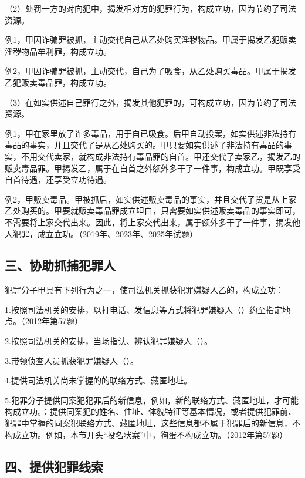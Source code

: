 （2）处罚一方的对向犯中，揭发相对方的犯罪行为，构成立功，因为节约了司法资源。

例1，甲因诈骗罪被抓，主动交代自己从乙处购买淫秽物品。甲属于揭发乙犯贩卖淫秽物品牟利罪，构成立功。

例2，甲因诈骗罪被抓，主动交代，自己为了吸食，从乙处购买毒品。甲属于揭发乙犯贩卖毒品罪，构成立功。

（3）在如实供述自己罪行之外，揭发其他犯罪的，可构成立功，因为节约了司法资源。

例1，甲在家里放了许多毒品，用于自已吸食。后甲自动投案，如实供述非法持有毒品的事实，并且交代了是从乙处购买的。甲只要如实供述了非法持有毒品的事实，不用交代卖家，就构成非法持有毒品罪的自首。甲还交代了卖家乙，揭发乙的贩卖毒品罪。甲揭发乙，属于在自首之外额外多干了一件事，构成立功。甲既享受自首待遇，还享受立功待遇。

例2，甲贩卖毒品。甲被抓后，如实供述贩卖毒品的事实，并且交代了货是从上家乙处购买的。甲要就贩卖毒品罪成立坦白，只需要如实供述贩卖毒品的事实即可，不需要将上家交代出来。因此，将上家交代出来，属于额外多干了一件事，揭发他人犯罪，成立立功。（2019年、2023年、2025年试题）

\subsection*{三、协助抓捕犯罪人}

犯罪分子甲具有下列行为之一，使司法机关抓获犯罪嫌疑人乙的，构成立功：

1.按照司法机关的安排，以打电话、发信息等方式将犯罪嫌疑人（）约至指定地点。（2012年第57题）

2.按照司法机关的安排，当场指认、辨认犯罪嫌疑人（）。

3.带领侦查人员抓获犯罪嫌疑人（）。

4.提供司法机关尚未掌握的的联络方式、藏匿地址。

5.犯罪分子提供同案犯犯罪后的新信息，例如，新的联络方式、藏匿地址，才可能构成立功。：提供同案犯的姓名、住址、体貌特征等基本情况，或者提供犯罪前、犯罪中掌握的同案犯联络方式、藏匿地址，这些信息都不属于犯罪后的新信息，不构成立功。例如，本节开头“投名状案”中，狗蛋不构成立功。（2012年第57题）

\subsection*{四、提供犯罪线索}

